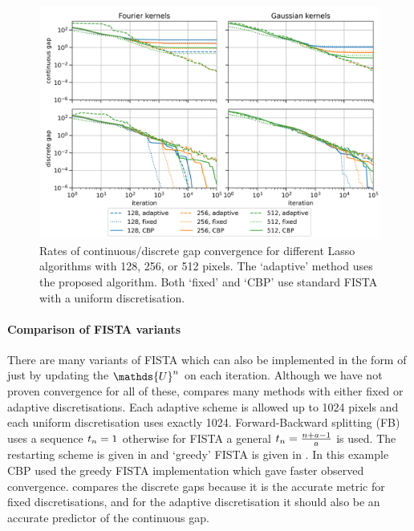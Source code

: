 \documentclass[10pt,a4paper,onecolumn]{article}
\numberwithin{equation}{section}
\let\F\mathds\let\C\mathcal\newcommand{\R}{\F{R}}\newcommand{\A}{\C{A}}
\newcommand*{\spcf}[1]{%
	\IfEqCase{#1}{%
		{0}{\F{U}}%
		{1}{\F{V}}%
		{2}{\F{W}}%
	}[\F{U}#1]%
}
\newcommand*{\vart}[1]{%
	\IfEqCase{#1}{%
		{0}{s}%
		{1}{t}%
	}[t#1]%
}
\begin{document}
\begin{figure}[H]\centering
	\includegraphics[width=.84\textwidth]{lasso_ndofs_convergence}
	\caption{Rates of continuous/discrete gap convergence for different Lasso algorithms with 128, 256, or 512 pixels. The `adaptive' method uses the proposed algorithm. Both `fixed' and `CBP' use standard FISTA with a uniform discretisation.}\label{fig:ca: convergence with ndofs}
\end{figure}

\paragraph{Comparison of FISTA variants}
There are many variants of FISTA which can also be implemented in the form of  just by updating the $\spcf0^n$ on each iteration. Although we have not proven convergence for all of these,  compares many methods with either fixed or adaptive discretisations. Each adaptive scheme is allowed up to 1024 pixels and each uniform discretisation uses exactly 1024. Forward-Backward splitting (FB) uses a sequence $\vart1_n=1$ otherwise for FISTA a general $\vart1_n = \frac{n+a-1}{a}$ is used. The restarting scheme is given in  and `greedy' FISTA is given in . In this example CBP used the greedy FISTA implementation which gave faster observed convergence.  compares the discrete gaps because it is the accurate metric for fixed discretisations, and for the adaptive discretisation it should also be an accurate predictor of the continuous gap. 
\end{document}
